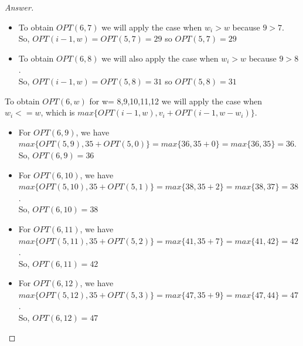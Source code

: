 \documentclass[11pt]{article}
\theoremstyle{definition}
\theoremstyle{definition}
\theoremstyle{definition}
\begin{document}
\begin{proof}[Answer]
\begin{itemize}
\item To obtain $OPT(6, 7)$ we will apply the case when  $w_i>w$ because $9>7$. \\ So, $OPT(i-1,w)=OPT(5,7)=29$ so $OPT(5,7)= 29$
\item To obtain $OPT(6, 8)$ we will also apply the case when  $w_i>w$ because $9>8$. \\ So, $OPT(i-1,w)=OPT(5,8)=31$ so $OPT(5,8)= 31$\\
\end{itemize}
To obtain $OPT(6, w)$  for w= 8,9,10,11,12 we will apply the case when  $w_i<=w$, which is $max\{OPT(i-1,w), v_i+OPT(i-1,w-w_i)\}$.
\begin{itemize}
\item For $OPT(6, 9)$, we have \\ $max\{OPT(5,9), 35+OPT(5,0)\}= max\{36, 35+0\}=max\{36,35\}= 36$. \\So,  $OPT(6, 9)= 36$ 
\item For $OPT(6, 10)$, we have \\ $max\{OPT(5,10), 35+OPT(5,1)\}= max\{38, 35+2\}=max\{38,37\}= 38$. \\So,  $OPT(6, 10)= 38$ 
\item For $OPT(6, 11)$, we have \\ $max\{OPT(5,11), 35+OPT(5,2)\}= max\{41, 35+7\}=max\{41,42\}= 42$. \\So,  $OPT(6, 11)= 42$ 
\item For $OPT(6, 12)$, we have \\ $max\{OPT(5,12), 35+OPT(5,3)\}= max\{47, 35+9\}=max\{47,44\}= 47$. \\So,  $OPT(6, 12)= 47$ 
\end{itemize}

\end{proof}
\end{document}
